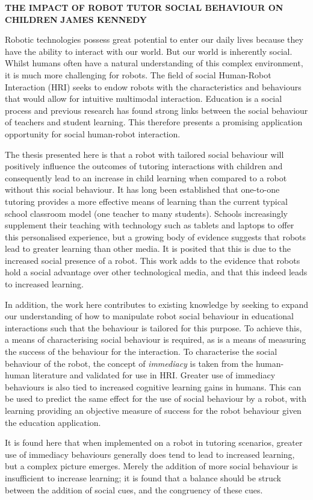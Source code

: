 \textbf{THE IMPACT OF ROBOT TUTOR SOCIAL BEHAVIOUR ON CHILDREN}\newline
\textbf{JAMES KENNEDY}

Robotic technologies possess great potential to enter our daily lives because they have the ability to interact with our world. But our world is inherently social. Whilst humans often have a natural understanding of this complex environment, it is much more challenging for robots. The field of social Human-Robot Interaction (HRI) seeks to endow robots with the characteristics and behaviours that would allow for intuitive multimodal interaction. Education is a social process and previous research has found strong links between the social behaviour of teachers and student learning. This therefore presents a promising  application opportunity for social human-robot interaction.

The thesis presented here is that a robot with \gls{tailored} social behaviour will positively influence the outcomes of tutoring interactions with children and consequently lead to an increase in child \gls{learning} when compared to a robot without this social behaviour. It has long been established that one-to-one tutoring provides a more effective means of learning than the current typical school classroom model (one teacher to many students). Schools increasingly supplement their teaching with technology such as tablets and laptops to offer this personalised experience, but a growing body of evidence suggests that robots lead to greater learning than other media. It is posited that this is due to the increased social presence of a robot. This work adds to the evidence that robots hold a social advantage over other technological media, and that this indeed leads to increased learning.

In addition, the work here contributes to existing knowledge by seeking to expand our understanding of how to manipulate robot social behaviour in educational interactions such that the behaviour is tailored for this purpose. To achieve this, a means of characterising social behaviour is required, as is a means of measuring the success of the behaviour for the interaction. To characterise the social behaviour of the robot, the concept of \textit{immediacy} is taken from the human-human literature and validated for use in HRI. Greater use of immediacy behaviours is also tied to increased cognitive learning gains in humans. This can be used to predict the same effect for the use of social behaviour by a robot, with learning providing an objective measure of success for the robot behaviour given the education application.

It is found here that when implemented on a robot in tutoring scenarios, greater use of immediacy behaviours generally does tend to lead to increased learning, but a complex picture emerges. Merely the addition of more social behaviour is insufficient to increase learning; it is found that a balance should be struck between the addition of social cues, and the congruency of these cues.